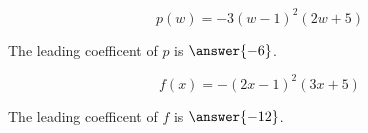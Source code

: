 \documentclass{ximera}
\begin{document}
\begin{exercise}
\begin{question}


\[
p(w) = -3(w-1)^2(2w+5)
\]


The leading coefficent of $p$ is $\answer{-6}$.

\end{question}











\begin{question}


\[
f(x) = -(2x-1)^2(3x+5)
\]


The leading coefficent of $f$ is $\answer{-12}$.

\end{question}






\end{exercise}
\end{document}
